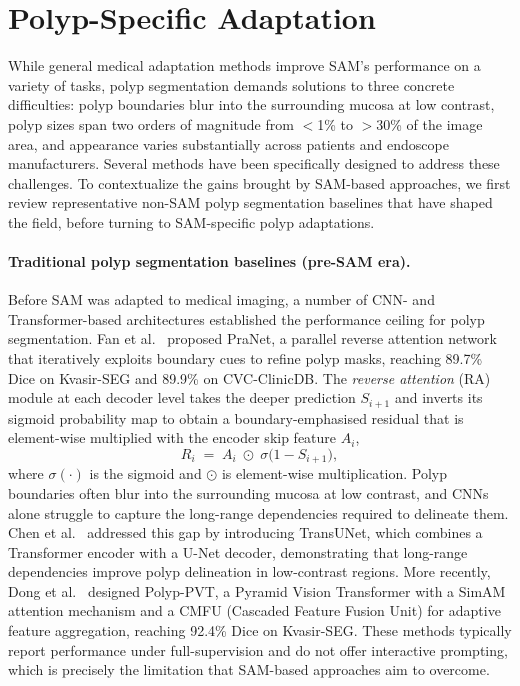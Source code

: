\section{Polyp-Specific Adaptation}

While general medical adaptation methods improve SAM's performance on a variety of tasks, polyp segmentation demands solutions to three concrete difficulties: polyp boundaries blur into the surrounding mucosa at low contrast, polyp sizes span two orders of magnitude from $<$1\% to $>$30\% of the image area, and appearance varies substantially across patients and endoscope manufacturers. Several methods have been specifically designed to address these challenges. To contextualize the gains brought by SAM-based approaches, we first review representative non-SAM polyp segmentation baselines that have shaped the field, before turning to SAM-specific polyp adaptations.

\paragraph{Traditional polyp segmentation baselines (pre-SAM era).}
Before SAM was adapted to medical imaging, a number of CNN- and Transformer-based architectures established the performance ceiling for polyp segmentation. Fan et al.\ \cite{fan2020pranet} proposed PraNet, a parallel reverse attention network that iteratively exploits boundary cues to refine polyp masks, reaching 89.7\% Dice on Kvasir-SEG and 89.9\% on CVC-ClinicDB. The \emph{reverse attention} (RA) module at each decoder level takes the deeper prediction $S_{i+1}$ and inverts its sigmoid probability map to obtain a boundary-emphasised residual that is element-wise multiplied with the encoder skip feature $A_{i}$,
\begin{equation}
  R_{i} \;=\; A_{i} \;\odot\; \sigma\!\bigl(1 - S_{i+1}\bigr),
  \label{eq:pranet-ra}
\end{equation}
where $\sigma(\cdot)$ is the sigmoid and $\odot$ is element-wise multiplication. Polyp boundaries often blur into the surrounding mucosa at low contrast, and CNNs alone struggle to capture the long-range dependencies required to delineate them. Chen et al.\ \cite{chen2021transunet} addressed this gap by introducing TransUNet, which combines a Transformer encoder with a U-Net decoder, demonstrating that long-range dependencies improve polyp delineation in low-contrast regions. More recently, Dong et al.\ \cite{dong2022polyppvt} designed Polyp-PVT, a Pyramid Vision Transformer with a SimAM attention mechanism and a CMFU (Cascaded Feature Fusion Unit) for adaptive feature aggregation, reaching 92.4\% Dice on Kvasir-SEG. These methods typically report performance under full-supervision and do not offer interactive prompting, which is precisely the limitation that SAM-based approaches aim to overcome.

